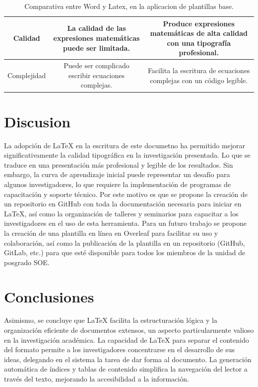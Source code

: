 \documentclass[10pt]{article}
\begin{document}
\begin{table}[h!]
{\begin{tabular}{|c|c|c|}
            {Calidad}         & La calidad de las expresiones matemáticas puede ser limitada.         & Produce expresiones matemáticas de alta calidad con una tipografía profesional.\\ \hline
            {Complejidad}     & Puede ser complicado escribir ecuaciones complejas.          & Facilita la escritura de ecuaciones complejas con un código legible.              \\ \hline
            \end{tabular}
        }
        \caption{Comparativa entre Word y Latex, en la aplicacion de plantillas base.}
        \label{tab:Comparativas}
    \end{table}
\vspace{0.5cm}

    \section{Discusion}
    La adopción de LaTeX en la escritura de este documetno ha permitido mejorar significativamente la calidad tipográfica en la investigación presentada. 
    Lo que se traduce en una presentación más profesional y legible de los resultados. Sin embargo, la curva de aprendizaje inicial puede representar un desafío para algunos investigadores, lo que requiere la implementación de programas de capacitación y soporte técnico.
    Por este motivo es que se propone la creación de un repositorio en GitHub con toda la documentación necesaria para iniciar en LaTeX, así como la organización de talleres y seminarios para capacitar a los investigadores en el uso de esta herramienta.
    Para un futuro trabajo se propone la creación de una plantilla en línea en Overleaf para facilitar su uso y colaboración, así como la publicación de la plantilla en un repositorio (GitHub, GitLab, etc.) para que esté disponible para todos los miembros de la unidad de posgrado SOE.

    \section{Conclusiones}
    Asimismo, se concluye que LaTeX facilita la estructuración lógica y la organización eficiente de documentos extensos, un aspecto particularmente valioso en la investigación académica. 
    La capacidad de LaTeX para separar el contenido del formato permite a los investigadores concentrarse en el desarrollo de sus ideas, delegando en el sistema la tarea de dar forma al documento. 
    La generación automática de índices y tablas de contenido simplifica la navegación del lector a través del texto, mejorando la accesibilidad a la información.

%
\printbibliography
%
\end{document}
